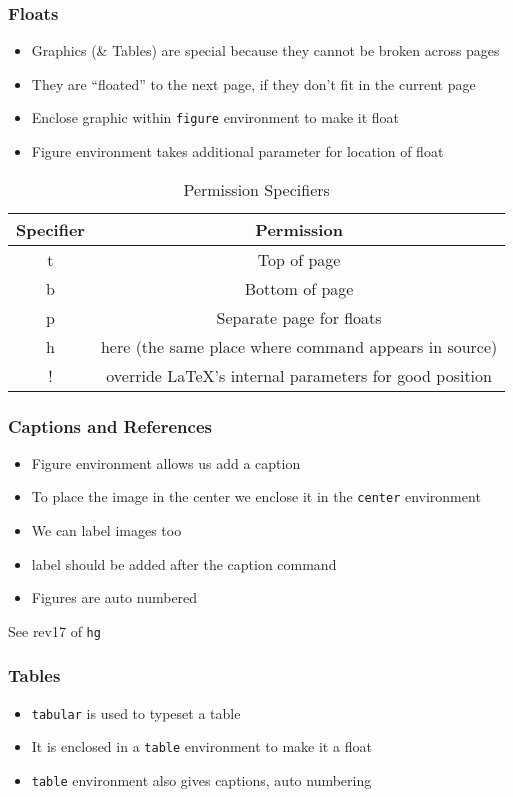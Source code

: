 \documentclass{beamer}
\newcommand{\typ}[1]{\lstinline{#1}}
\begin{document}
\begin{frame}[fragile]
  \frametitle{Floats}
  \begin{itemize}
  \item Graphics (\& Tables) are special because they cannot be broken
    across pages 
  \item They are ``floated'' to the next page, if they don't fit in
    the current page 
  \item Enclose graphic within \lstinline+figure+ environment to make
    it float 
  \item Figure environment takes additional parameter for location of
    float 
  \end{itemize}
  \begin{table}
    \caption{Permission Specifiers}
    
    \begin{tabular}{|c|c|}
      Specifier & Permission\\\hline
      t & Top of page\\
      b & Bottom of page\\
      p & Separate page for floats\\
      h & here (the same place where command appears in source)\\
      ! & override \LaTeX's internal parameters for good position
    \end{tabular}
  \end{table}
\end{frame}

\begin{frame}
  \frametitle{Captions and References}
  \begin{itemize}
  \item Figure environment allows us add a caption
  \item To place the image in the center we enclose it in the
    \lstinline+center+ environment 
  \item We can label images too
  \item label should be added after the caption command
  \item Figures are auto numbered
  \end{itemize}
  \tiny See rev17 of \typ{hg}
\end{frame}

\begin{frame}[frame]
  \frametitle{Tables}
  \begin{itemize}
  \item \lstinline+tabular+ is used to typeset a table
  \item It is enclosed in a \lstinline+table+ environment to make it a
    float 
  \item \lstinline+table+ environment also gives captions, auto
    numbering  
  \end{itemize}
\end{frame}
\end{document}
